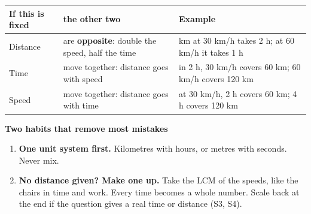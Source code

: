 \documentclass[11pt,a4paper]{article}
\newcommand{\infobox}[2]{\par\medskip\noindent\begingroup\setlength{\fboxsep}{7pt}%
  \colorbox{codebg}{\parbox{\dimexpr\linewidth-14pt\relax}{\textbf{\color{ember}#1}\par\smallskip #2}}\endgroup\par\medskip}
\begin{document}
\begin{center}\small\renewcommand{\arraystretch}{1.18}\setlength{\tabcolsep}{7pt}
\begin{tabularx}{\linewidth}{@{}l>{\raggedright\arraybackslash}X>{\raggedright\arraybackslash}X@{}}
\toprule
\textbf{\color{slate}If this is fixed} & \textbf{\color{slate}the other two} & \textbf{\color{slate}Example} \\ \midrule
Distance & are \textbf{opposite}: double the speed, half the time & 60 km at 30 km/h takes 2 h; at 60 km/h it takes 1 h \\
Time & move together: distance goes with speed & in 2 h, 30 km/h covers 60 km; 60 km/h covers 120 km \\
Speed & move together: distance goes with time & at 30 km/h, 2 h covers 60 km; 4 h covers 120 km \\
\bottomrule
\end{tabularx}\end{center}

\infobox{Two habits that remove most mistakes}{
\begin{enumerate}
\item \textbf{One unit system first.} Kilometres with hours, or metres with seconds. Never mix.
\item \textbf{No distance given? Make one up.} Take the LCM of the speeds, like the chairs in time and work. Every time becomes a whole number. Scale back at the end if the question gives a real time or distance (S3, S4).
\end{enumerate}}
\end{document}
